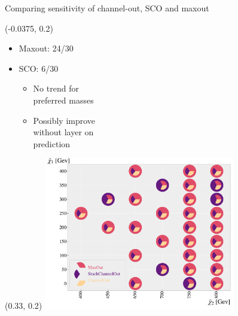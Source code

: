 \documentclass[UKenglish]{beamer}
\begin{document}
\begin{frame}{Comparing sensitivity of channel-out, SCO and maxout}
    \begin{textblock}{1}(-0.0375, 0.2)
        \begin{itemize}
            \item Maxout: 24/30
            \item SCO: 6/30
            \begin{itemize}
                \item No trend for \\
                preferred masses
                \item Possibly improve\\
                      without layer on \\
                      prediction 
            \end{itemize}
        \end{itemize}
    \end{textblock}
    \begin{textblock}{1}(0.33, 0.2)
    \includegraphics[width = 0.625\textwidth]{figures/Comps/EnsemblesNetworkComp.pdf}
    \end{textblock}
\end{frame}
\end{document}
